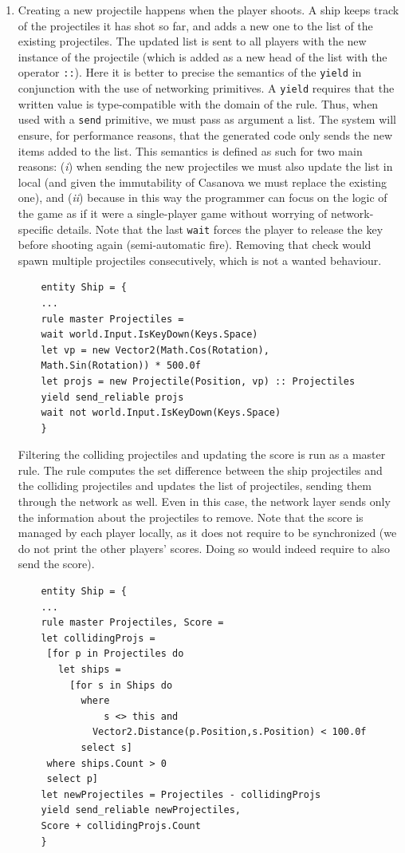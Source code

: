\begin{enumerate}
	\item Creating a new projectile happens when the player shoots. A ship keeps track of the projectiles it has shot so far, and adds a new one to the list of the existing projectiles. The updated list is sent to all players with the new instance of the projectile (which is added as a new head of the list with the operator \texttt{::}). Here it is better to precise the semantics of the \texttt{yield} in conjunction with the use of networking primitives. A \texttt{yield} requires that the written value is type-compatible with the domain of the rule. Thus, when used with a \texttt{send} primitive, we must pass as argument a list. The system will ensure, for performance reasons, that the generated code only sends the new items added to the list. This semantics is defined as such for two main reasons: (\textit{i}) when sending the new projectiles we must also update the list in local (and given the immutability of Casanova we must replace the existing one), and (\textit{ii}) because in this way the programmer can focus on the logic of the game as if it were a single-player game without worrying of network-specific details. Note that the last \texttt{wait} forces the player to release the key before shooting again (semi-automatic fire). Removing that check would spawn multiple projectiles consecutively, which is not a wanted behaviour.
	
	\begin{lstlisting}
	entity Ship = {
	...
	rule master Projectiles =
	wait world.Input.IsKeyDown(Keys.Space)
	let vp = new Vector2(Math.Cos(Rotation), 
	Math.Sin(Rotation)) * 500.0f
	let projs = new Projectile(Position, vp) :: Projectiles
	yield send_reliable projs
	wait not world.Input.IsKeyDown(Keys.Space)
	}
	\end{lstlisting}
	
	Filtering the colliding projectiles and updating the score is run as a master rule. The rule computes the set difference between the ship projectiles and the colliding projectiles and updates the list of projectiles, sending them through the network as well. Even in this case, the network layer sends only the information about the projectiles to remove. Note that the score is managed by each player locally, as it does not require to be synchronized (we do not print the other players' scores. Doing so would indeed require to also send the score).
	
	\begin{lstlisting}
	entity Ship = {
	...
	rule master Projectiles, Score =
  	let collidingProjs =
  	 [for p in Projectiles do
  	   let ships =
  	     [for s in Ships do
  	       where 
	           s <> this and 
  	         Vector2.Distance(p.Position,s.Position) < 100.0f
  	       select s]
  	 where ships.Count > 0
  	 select p]
  	let newProjectiles = Projectiles - collidingProjs
  	yield send_reliable newProjectiles, 
  	Score + collidingProjs.Count 
	}
	\end{lstlisting}
\end{enumerate}

